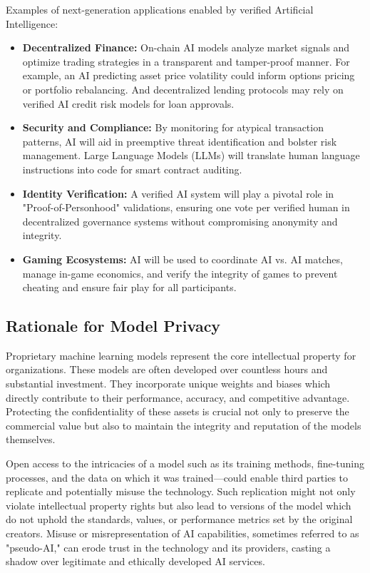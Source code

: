 \documentclass[conference]{IEEEtran}
\begin{document}
Examples of next-generation applications enabled by verified Artificial Intelligence:
\begin{itemize}
    \item \textbf{Decentralized Finance:}  On-chain AI models analyze market signals and optimize trading strategies in a transparent and tamper-proof manner. For example, an AI predicting asset price volatility could inform options pricing or portfolio rebalancing. And decentralized lending protocols may rely on verified AI credit risk models for loan approvals.
    \item \textbf{Security and Compliance:} By monitoring for atypical transaction patterns, AI will aid in preemptive threat identification and bolster risk management. Large Language Models (LLMs) will translate human language instructions into code for smart contract auditing.
    \item \textbf{Identity Verification:} A verified AI system will play a pivotal role in "Proof-of-Personhood" validations, ensuring one vote per verified human in decentralized governance systems without compromising anonymity and integrity.
    \item \textbf{Gaming Ecosystems:} AI will be used to coordinate AI vs. AI matches, manage in-game economics, and verify the integrity of games to prevent cheating and ensure fair play for all participants.
\end{itemize}

\subsection{Rationale for Model Privacy}
Proprietary machine learning models represent the core intellectual property for organizations. These models are often developed over countless hours and substantial investment. They incorporate unique weights and biases which directly contribute to their performance, accuracy, and competitive advantage. Protecting the confidentiality of these assets is crucial not only to preserve the commercial value but also to maintain the integrity and reputation of the models themselves.

Open access to the intricacies of a model such as its training methods, fine-tuning processes, and the data on which it was trained—could enable third parties to replicate and potentially misuse the technology. Such replication might not only violate intellectual property rights but also lead to versions of the model which do not uphold the standards, values, or performance metrics set by the original creators. Misuse or misrepresentation of AI capabilities, sometimes referred to as "pseudo-AI," can erode trust in the technology and its providers, casting a shadow over legitimate and ethically developed AI services.
\end{document}
